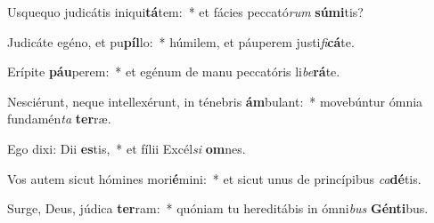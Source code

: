 \item Usquequo judicátis iniqui\textbf{tá}tem:~* et fácies peccató\textit{rum} \textbf{sú}\textbf{mi}tis?
\item Judicáte egéno, et pu\textbf{píl}lo:~* húmilem, et páuperem justi\textit{fi}\textbf{cá}te.
\item Erípite \textbf{páu}perem:~* et egénum de manu peccatóris li\textit{be}\textbf{rá}te.
\item Nesciérunt, neque intellexérunt, in ténebris \textbf{ám}bulant:~* movebúntur ómnia fundamén\textit{ta} \textbf{ter}ræ.
\item Ego dixi: Dii \textbf{es}tis,~* et fílii Excél\textit{si} \textbf{om}nes.
\item Vos autem sicut hómines mori\textbf{é}mini:~* et sicut unus de princípibus \textit{ca}\textbf{dé}tis.
\item Surge, Deus, júdica \textbf{ter}ram:~* quóniam tu hereditábis in ómni\textit{bus} \textbf{Gén}\textbf{ti}bus.
